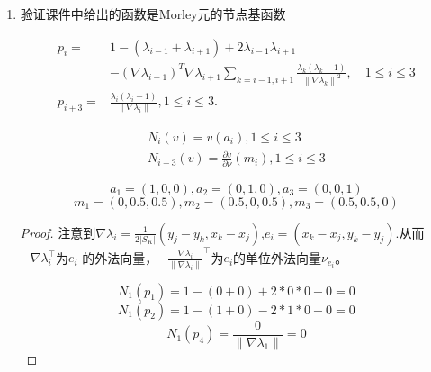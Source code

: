 \documentclass[12pt,a4paper]{article}
\begin{document}
\begin{enumerate}
		Morley元的有限元空间:
		
		$V_h=\{v\in L^2(\Omega)\mid v|_K\in P_2(K),\forall K\in T_h,v$在$T_h$的所有顶点连续，
		$\frac{\partial v}{\partial\nu_\mathrm{e}}$在$\mathcal{T} _h$所 有 内 边 e的 中 点 连 续 $\}$
		
		\begin{proof}
			不妨设某条内边$e = (-1,0)\rightarrow(1,0)$,相邻单元为$K_1,K_2$.
			
			考虑$v |_ {K_1} = x^2-1,v |_ {K_2} = 1-x^2$.满足$v \in V_h$但$v \notin H^1(\Omega)$
		\end{proof}
		\item 验证课件中给出的函数是Morley元的节点基函数
		
		\begin{equation*}
			\begin{aligned}
				p_{i}=& 1-(\lambda_{i-1}+\lambda_{i+1})+2\lambda_{i-1}\lambda_{i+1}  \\
				&-\left(\nabla\lambda_{i-1}\right)^T\nabla\lambda_{i+1}\sum_{k=i-1,i+1}\frac{\lambda_k(\lambda_k-1)}{\left\|\nabla\lambda_k\right\|^2},\quad1\leq i\leq3 \\
				p_{i+3}=& \frac{\lambda_{i}(\lambda_{i}-1)}{\|\nabla\lambda_{i}\|},1\leq i\leq3. 
			\end{aligned}
		\end{equation*}
		
		\begin{equation*}
			\begin{aligned}
				N_i(v)=v(a_i),1\leq i\leq3\\N_{i+3}(v)=\frac{\partial v}{\partial\nu}(m_i),1\leq i\leq3
			\end{aligned}
		\end{equation*}
		
		$$a_1 = (1,0,0),a_2=(0,1,0),a_3=(0,0,1)$$
		$$m_1 = (0,0.5,0.5),m_2=(0.5,0,0.5),m_3=(0.5,0.5,0)$$
		
		\begin{proof}
			
			
			注意到$\nabla \lambda_i = \frac{1}{2|S_K|} (y_j-y_k,x_k-x_j)$,$e_i=(x_k-x_j,y_k-y_j)$.从而$-\nabla \lambda_i ^\top$为$e_i$ 的外法向量，$-\frac{\nabla \lambda_i}{\|\nabla \lambda_i\|}^\top$为$e_i$的单位外法向量$\nu_{e_i}$。
			
			$$N_1(p_1) = 1-(0+0)+2*0*0-0 = 0$$
			$$N_1(p_2) = 1- (1+0) - 2*1*0 - 0 = 0$$
			$$N_1(p_4) = \frac{0}{\|\nabla \lambda_1\|} = 0$$
			

\end{proof}
\end{enumerate}
\end{document}
